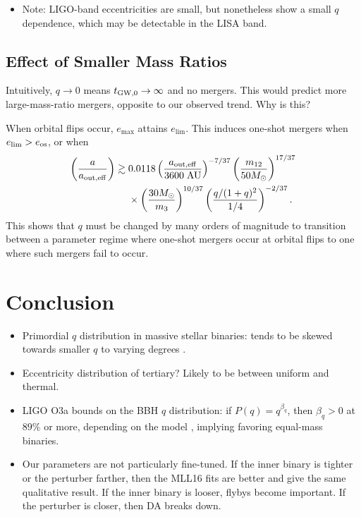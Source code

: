 \documentclass[
        fleqn,
        usenatbib,
    ]{mnras}
\newcommand*{\p}[1]{\left(#1\right)}
\begin{document}
\begin{itemize}
    \item Note: LIGO-band eccentricities are small, but nonetheless show a small
        $q$ dependence, which may be detectable in the LISA band.
\end{itemize}

\subsection{Effect of Smaller Mass Ratios}

Intuitively, $q \to 0$ means $t_{\rm GW, 0} \to \infty$ and no mergers. This
would predict more large-mass-ratio mergers, opposite to our observed trend. Why
is this?

When orbital flips occur, $e_{\max}$ attains $e_{\lim}$. This induces one-shot
mergers when $e_{\lim} > e_{\rm os}$, or when
\begin{align}
    \p{\frac{a}{a_{\rm out, eff}}} \gtrsim{}&
        0.0118
        \p{\frac{a_{\rm out, eff}}{3600\;\mathrm{AU}}}^{-7/37}
        \p{\frac{m_{12}}{50M_{\odot}}}^{17/37}\nonumber\\
        &\times\p{\frac{30M_{\odot}}{m_3}}^{10/37}
        \p{\frac{q / (1 + q)^2}{1/4}}^{-2/37}.
\end{align}
This shows that $q$ must be changed by many orders of magnitude to transition
between a parameter regime where one-shot mergers occur at orbital flips to one
where such mergers fail to occur.

\section{Conclusion}

\begin{itemize}
    \item Primordial $q$ distribution in massive stellar binaries: tends to be
        skewed towards smaller $q$ to varying degrees \citep{sana2012binary,
        el2019discovery}.

    \item Eccentricity distribution of tertiary? Likely to be between uniform
        and thermal.

    \item LIGO O3a bounds on the BBH $q$ distribution: if $P(q) = q^{\beta_q}$,
        then $\beta_q > 0$ at $89\%$ or more, depending on the model
        \citep{LIGOO3a}, implying favoring equal-mass binaries.

    \item Our parameters are not particularly fine-tuned. If the inner binary is
        tighter or the perturber farther, then the MLL16 fits are better and
        give the same qualitative result. If the inner binary is looser, flybys
        become important. If the perturber is closer, then DA breaks down.
\end{itemize}
\end{document}
